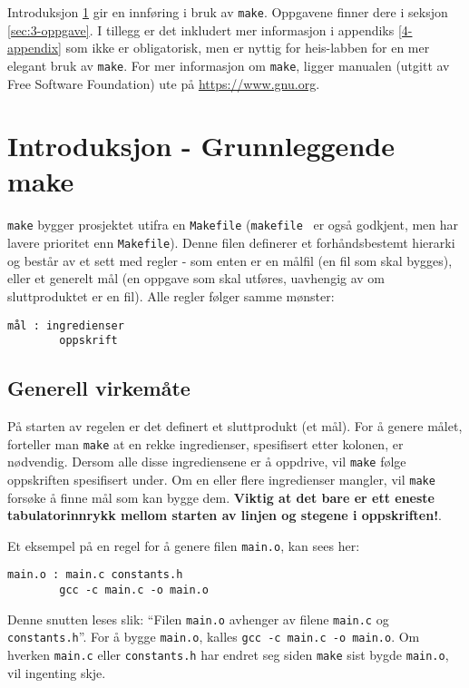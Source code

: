 \begin{alphasection}
 Introduksjon \ref{sec:2-innforing} gir en innføring i bruk av \verb|make|. Oppgavene finner dere i seksjon \ref{sec:3-oppgave}. I tillegg er det inkludert mer informasjon i appendiks \ref{4-appendix} som ikke er obligatorisk, men er nyttig for heis-labben for en mer elegant bruk av \verb|make|. For mer informasjon om \verb|make|, ligger manualen (utgitt av Free Software Foundation) ute på \href{https://www.gnu.org/software/make/manual/make.html}{https://www.gnu.org}.
 

\section{Introduksjon - Grunnleggende make}\label{sec:2-innforing}

\verb|make| bygger prosjektet utifra en \verb|Makefile| (\verb|makefile| \ er også godkjent, men har lavere prioritet enn \verb|Makefile|). Denne filen definerer et forhåndsbestemt hierarki og består av et sett med regler - som enten er en målfil (en fil som skal bygges), eller et generelt mål (en oppgave som skal utføres, uavhengig av om sluttproduktet er en fil). Alle regler følger samme mønster:

\begin{lstlisting}
mål : ingredienser
        oppskrift
\end{lstlisting}

\subsection{Generell virkemåte}
På starten av regelen er det definert et sluttprodukt (et mål). For å genere målet, forteller man \verb|make| at en rekke ingredienser, spesifisert etter kolonen, er nødvendig. Dersom alle disse ingrediensene er å oppdrive, vil \verb|make| følge oppskriften spesifisert under. Om en eller flere ingredienser mangler, vil \verb|make| forsøke å finne mål som kan bygge dem. \textcolor{RWTHrot100}{\textbf{Viktig at det bare er ett eneste tabulatorinnrykk mellom starten av linjen og stegene i oppskriften!}}.

Et eksempel på en regel for å genere filen \verb|main.o|, kan sees her:

\begin{lstlisting}
main.o : main.c constants.h
        gcc -c main.c -o main.o
\end{lstlisting}

Denne snutten leses slik: ``Filen \verb|main.o| avhenger av filene \verb|main.c| og \verb|constants.h|''. For å bygge  \verb|main.o|, kalles \verb|gcc -c main.c -o main.o|. Om hverken \verb|main.c| eller \verb|constants.h| har endret seg siden \verb|make| sist bygde \verb|main.o|, vil ingenting skje.


\end{alphasection}
